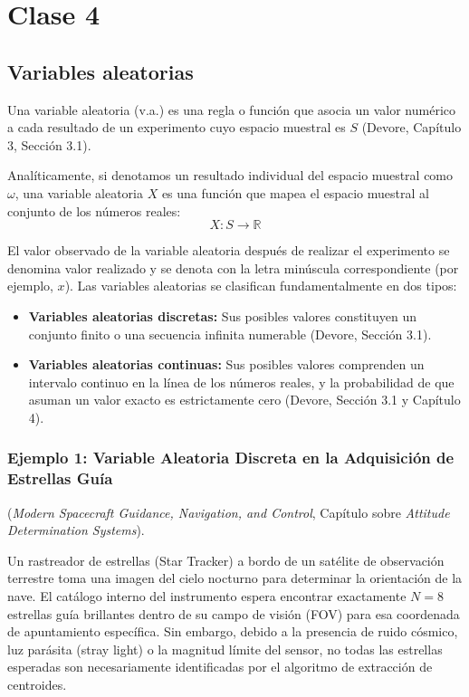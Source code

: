 \chapter{Clase 4}

\section{Variables aleatorias}

Una variable aleatoria (v.a.) es una regla o función que asocia un valor numérico a cada resultado de un experimento cuyo espacio muestral es $S$ (Devore, Capítulo 3, Sección 3.1). 

Analíticamente, si denotamos un resultado individual del espacio muestral como $\omega$, una variable aleatoria $X$ es una función que mapea el espacio muestral al conjunto de los números reales:
$$ X: S \rightarrow \mathbb{R} $$

El valor observado de la variable aleatoria después de realizar el experimento se denomina valor realizado y se denota con la letra minúscula correspondiente (por ejemplo, $x$). Las variables aleatorias se clasifican fundamentalmente en dos tipos:
\begin{itemize}
    \item \textbf{Variables aleatorias discretas:} Sus posibles valores constituyen un conjunto finito o una secuencia infinita numerable (Devore, Sección 3.1).
    \item \textbf{Variables aleatorias continuas:} Sus posibles valores comprenden un intervalo continuo en la línea de los números reales, y la probabilidad de que asuman un valor exacto es estrictamente cero (Devore, Sección 3.1 y Capítulo 4).
\end{itemize}

\subsection{Ejemplo 1: Variable Aleatoria Discreta en la Adquisición de Estrellas Guía}

(\textit{Modern Spacecraft Guidance, Navigation, and Control}, Capítulo sobre \textit{Attitude Determination Systems}). 

Un rastreador de estrellas (Star Tracker) a bordo de un satélite de observación terrestre toma una imagen del cielo nocturno para determinar la orientación de la nave. El catálogo interno del instrumento espera encontrar exactamente $N = 8$ estrellas guía brillantes dentro de su campo de visión (FOV) para esa coordenada de apuntamiento específica. Sin embargo, debido a la presencia de ruido cósmico, luz parásita (stray light) o la magnitud límite del sensor, no todas las estrellas esperadas son necesariamente identificadas por el algoritmo de extracción de centroides.

